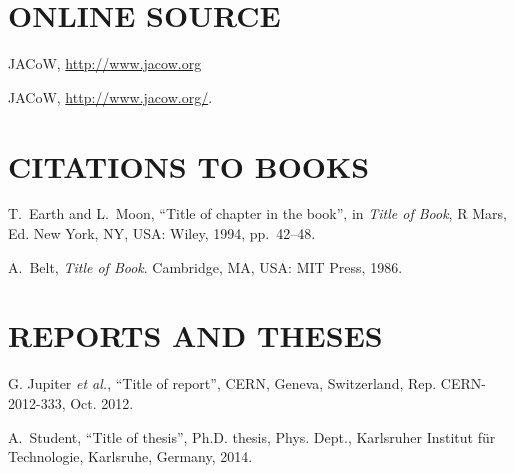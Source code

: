 \vspace*{-.5\baselineskip}
\section{ONLINE SOURCE}

\begin{thebibliography}{99} %
  \setcounter{enumi}{11}
		JACoW, \url{http://www.jacow.org} 

  \setcounter{enumi}{11}
		JACoW, \url{http://www.jacow.org/}.  

\end{thebibliography}

\section{CITATIONS TO BOOKS}

\begin{thebibliography}{99} %
	\setcounter{enumi}{12}
		T.~Earth and L.~Moon,
		“Title of chapter in the book”,
		in \emph{Title of Book}, R Mars, Ed. New York, NY, USA:
		Wiley, 1994, pp.~42--48. 
	
		A.~Belt, \emph{Title of Book}. Cambridge, MA, USA:
		MIT Press, 1986. 
\end{thebibliography}

\section{REPORTS AND THESES}

\begin{thebibliography}{99} %
	\setcounter{enumi}{14}
		G. Jupiter \emph{et al.},
		“Title of report”, CERN, Geneva, Switzerland,
		Rep. CERN-2012-333, Oct. 2012.

		A.~Student, “Title of thesis”,
		Ph.D. thesis, Phys. Dept.,
		Karlsruher Institut für Technologie, Karlsruhe,
		Germany, 2014.
\end{thebibliography}

